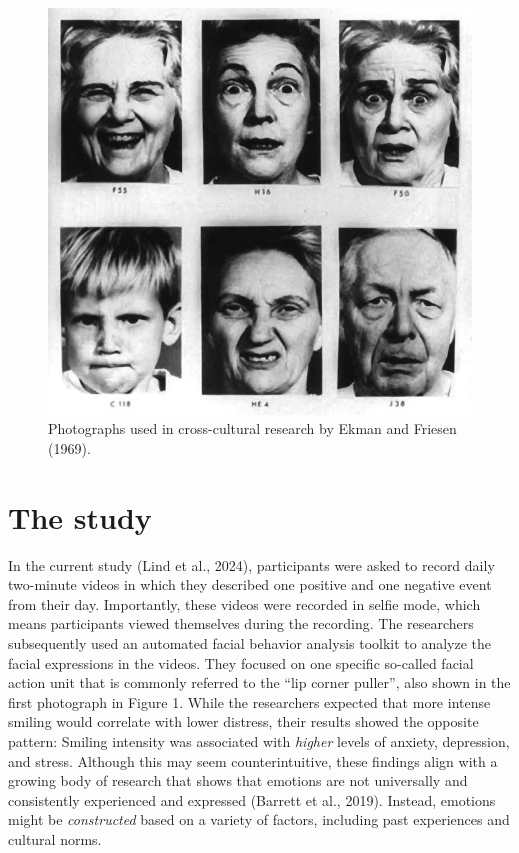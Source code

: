 \documentclass[authordate, reflection,issue]{jote-new-article}
\begin{document}
	\begin{figure}
		\includegraphics[width=\linewidth]{media/image1.jpeg}

		\caption{Photographs used in cross-cultural research by Ekman and Friesen (1969).}

		\label{fig:rId6}


	\end{figure}







	\section{The study }



	In the current study (Lind et al., 2024), participants were asked to record daily two-minute videos in which they described one positive and one negative event from their day. Importantly, these videos were recorded in selfie mode, which means participants viewed themselves during the recording. The researchers subsequently used an automated facial behavior analysis toolkit to analyze the facial expressions in the videos. They focused on one specific so-called facial action unit that is commonly referred to the “lip corner puller”, also shown in the first photograph in Figure 1. While the researchers expected that more intense smiling would correlate with lower distress, their results showed the opposite pattern: Smiling intensity was associated with \emph{higher} levels of anxiety, depression, and stress. Although this may seem counterintuitive, these findings align with a growing body of research that shows that emotions are not universally and consistently experienced and expressed (Barrett et al., 2019). Instead, emotions might be \emph{constructed} based on a variety of factors, including past experiences and cultural norms.
\end{document}
